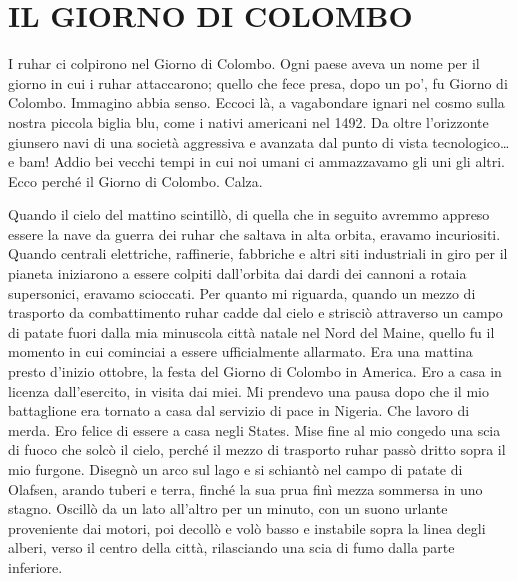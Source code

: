 \mainmatter

\chapter{IL GIORNO DI COLOMBO}\label{il-giorno-di-colombo}

\hfill\break

I ruhar ci colpirono nel Giorno di Colombo. Ogni paese aveva un nome per
il giorno in cui i ruhar attaccarono; quello che fece presa, dopo un
po', fu Giorno di Colombo. Immagino abbia senso. Eccoci là, a
vagabondare ignari nel cosmo sulla nostra piccola biglia blu, come i
nativi americani nel 1492. Da oltre l'orizzonte giunsero navi di una
società aggressiva e avanzata dal punto di vista tecnologico\ldots{} e
bam! Addio bei vecchi tempi in cui noi umani ci ammazzavamo gli uni gli
altri. Ecco perché il Giorno di Colombo. Calza.

Quando il cielo del mattino scintillò, di quella che in seguito avremmo
appreso essere la nave da guerra dei ruhar che saltava in alta orbita,
eravamo incuriositi. Quando centrali elettriche, raffinerie, fabbriche e
altri siti industriali in giro per il pianeta iniziarono a essere
colpiti dall'orbita dai dardi dei cannoni a rotaia supersonici, eravamo
scioccati. Per quanto mi riguarda, quando un mezzo di trasporto da
combattimento ruhar cadde dal cielo e strisciò attraverso un campo di
patate fuori dalla mia minuscola città natale nel Nord del Maine, quello
fu il momento in cui cominciai a essere ufficialmente allarmato. Era una
mattina presto d'inizio ottobre, la festa del Giorno di Colombo in
America. Ero a casa in licenza dall'esercito, in visita dai miei. Mi
prendevo una pausa dopo che il mio battaglione era tornato a casa dal
servizio di pace in Nigeria. Che lavoro di merda. Ero felice di essere a
casa negli States. Mise fine al mio congedo una scia di fuoco che solcò
il cielo, perché il mezzo di trasporto ruhar passò dritto sopra il mio
furgone. Disegnò un arco sul lago e si schiantò nel campo di patate di
Olafsen, arando tuberi e terra, finché la sua prua finì mezza sommersa
in uno stagno. Oscillò da un lato all'altro per un minuto, con un suono
urlante proveniente dai motori, poi decollò e volò basso e instabile
sopra la linea degli alberi, verso il centro della città, rilasciando
una scia di fumo dalla parte inferiore.

